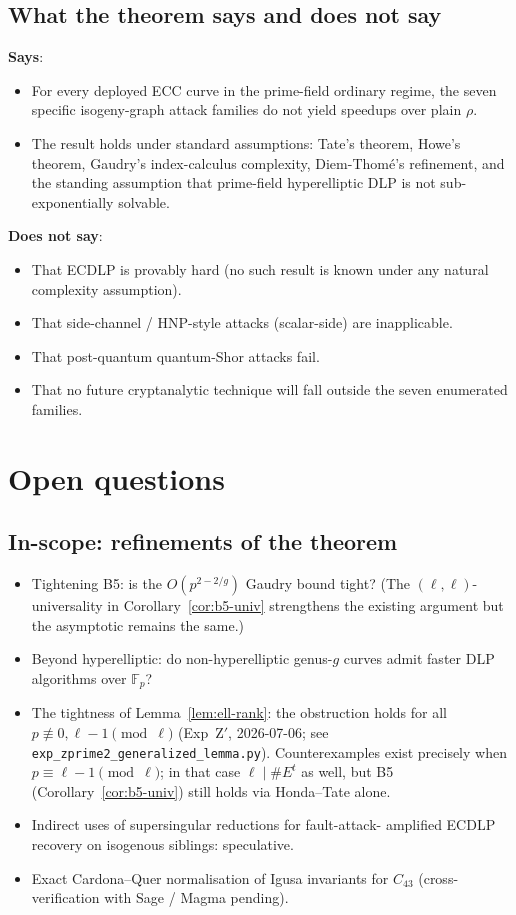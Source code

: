 \documentclass[11pt,a4paper]{article}
\theoremstyle{definition}
\newcommand{\FF}{\mathbb{F}}
\begin{document}
\subsection*{What the theorem says and does not say}

\textbf{Says}:
\begin{itemize}
\item For every deployed ECC curve in the prime-field ordinary
      regime, the seven specific isogeny-graph attack families do
      not yield speedups over plain $\rho$.
\item The result holds under standard assumptions: Tate's theorem,
      Howe's theorem, Gaudry's index-calculus complexity,
      Diem-Thomé's refinement, and the standing assumption that
      prime-field hyperelliptic DLP is not sub-exponentially solvable.
\end{itemize}

\textbf{Does not say}:
\begin{itemize}
\item That ECDLP is provably hard (no such result is known under
      any natural complexity assumption).
\item That side-channel / HNP-style attacks (scalar-side) are
      inapplicable.
\item That post-quantum quantum-Shor attacks fail.
\item That no future cryptanalytic technique will fall outside the
      seven enumerated families.
\end{itemize}

\section{Open questions}

\subsection*{In-scope: refinements of the theorem}
\begin{itemize}
\item Tightening B5: is the $O(p^{2 - 2/g})$ Gaudry bound tight?
      (The $(\ell,\ell)$-universality in Corollary~\ref{cor:b5-univ}
      strengthens the existing argument but the asymptotic remains
      the same.)
\item Beyond hyperelliptic: do non-hyperelliptic genus-$g$ curves
      admit faster DLP algorithms over $\FF_p$?
\item The tightness of Lemma~\ref{lem:ell-rank}: the obstruction holds
      for all $p \not\equiv 0, \ell{-}1 \pmod\ell$ (Exp~Z$'$, 2026-07-06;
      see \texttt{exp\_zprime2\_generalized\_lemma.py}).
      Counterexamples exist precisely when $p \equiv \ell{-}1 \pmod\ell$;
      in that case $\ell \mid \#E^t$ as well, but B5 (Corollary~\ref{cor:b5-univ})
      still holds via Honda--Tate alone.
\item Indirect uses of supersingular reductions for fault-attack-
      amplified ECDLP recovery on isogenous siblings: speculative.
\item Exact Cardona--Quer normalisation of Igusa invariants for
      $C_{43}$ (cross-verification with Sage / Magma pending).
\end{itemize}
\end{document}
